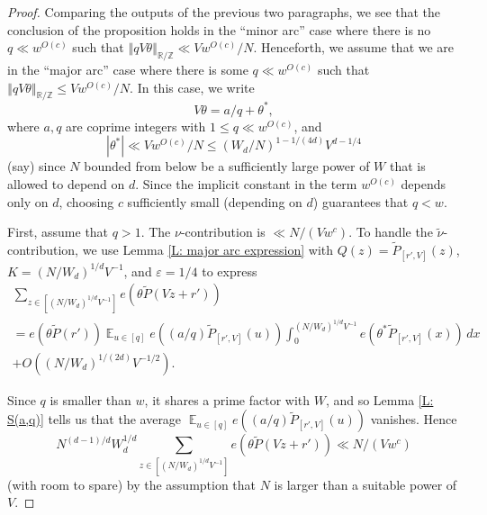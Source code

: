 \documentclass[11pt]{amsart}
\theoremstyle{definition}
\DeclareMathOperator*{\E}{\mathbb{E}}
\newcommand{\norm}[1]{\left\Vert #1\right\Vert}
\newcommand{\veps}{\varepsilon}
\begin{document}
\begin{proof}
Comparing the outputs of the previous two paragraphs, we see that the conclusion of the proposition holds in the ``minor arc'' case where there is no $q \ll w^{O(c)}$ such that $\norm{qV\theta}_{\mathbb{R}/\mathbb{Z}} \ll Vw^{O(c)}/N$.  Henceforth, we assume that we are in the ``major arc'' case where there is some $q \ll w^{O(c)}$ such that $\norm{qV\theta}_{\mathbb{R}/\mathbb{Z}} \leq Vw^{O(c)}/N$.  In this case, we write
$$V\theta=a/q+\theta^*,$$
where $a,q$ are coprime integers with $1\leq q \ll w^{O(c)}$, and 
$$|\theta^*| \ll Vw^{O(c)}/N\leq (W_d/N)^{1-1/(4d)}V^{d-1/4}$$ (say) since $N$ bounded from below be a sufficiently large power of $W$ that is allowed to depend on $d$.
Since the implicit constant in the term $w^{O(c)}$ depends only on $d$, choosing $c$ sufficiently small (depending on $d$) guarantees that $q<w$.

First, assume that $q>1$.  The $\nu$-contribution is $\ll N/(Vw^c)$.   To handle the $\tilde{\nu}$-contribution, we use Lemma \ref{L: major arc expression} with $Q(z) =\widetilde P_{[r',V]}(z)$, $K = (N/W_d)^{1/d}V^{-1}$, and $\veps = 1/4$ to express
\begin{multline*}
\sum_{z \in [(N/W_d)^{1/d}V^{-1}]} e(\theta\widetilde P(Vz+r'))\\
=e(\theta \widetilde P(r'))\E_{u\in [q]} e((a/q)\widetilde P_{[r',V]}(u)) \int_0^{(N/W_d)^{1/d}V^{-1}} e(\theta^* \widetilde P_{[r',V]}(x)) \,dx\\
+O((N/W_d)^{1/(2d)}V^{-1/2}).
\end{multline*}



Since $q$ is smaller than $w$, it shares a prime factor with $W$, and so Lemma \ref{L: S(a,q)} tells us that the average $\E_{u\in [q]} e((a/q)\widetilde P_{[r',V]}(u))$ vanishes.
Hence
$$N^{(d-1)/d}W_d^{1/d} \sum_{z \in [(N/W_d)^{1/d}V^{-1}]}e(\theta \widetilde P(Vz+r'))\ll N/(Vw^c)$$
(with room to spare) by the assumption that $N$ is larger than a suitable power of $V$.


\end{proof}
\end{document}
